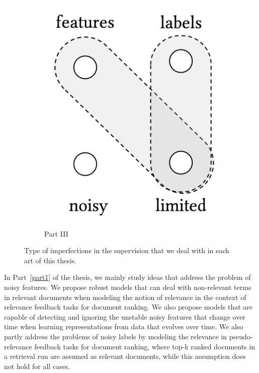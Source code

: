 \begin{figure}[t]
\begin{subfigure}[b]{0.32\textwidth}
    \centering
        \includegraphics[width=0.55\linewidth]{01-introduction/figs_and_tables/fig_p3.png}
        \caption{\label{fig:p3}Part III}
    \end{subfigure}
\caption{\label{fig:thesis_parts}Type of imperfections in the supervision that we deal with in each art of this thesis.}
\end{figure}

In Part~\ref{part1} of the thesis, we mainly study ideas that address the problem of noisy features. We propose robust models that can deal with non-relevant terms in relevant documents when modeling the notion of relevance in the context of relevance feedback tasks for document ranking. We also propose models that are capable of detecting and ignoring the unstable noisy features that change over time when learning representations from data that evolves over time. We also partly address the problems of noisy labels by modeling the relevance in pseudo-relevance feedback tasks for document ranking, where top-k ranked documents in a retrieval run are assumed as relevant documents, while this assumption does not hold for all cases.

